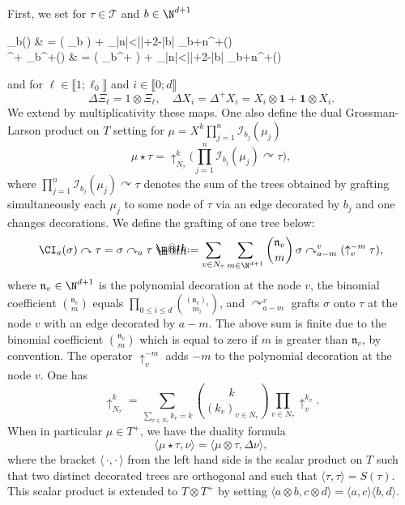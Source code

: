 \documentclass[11pt]{preprint}
\makeatletter
\def\id{\mathrm{id}}
\newcommand{\mcI}{\mathcal{I}}
\newcommand{\mcT}{\mathcal{T}}
\def\Labn{\mathfrak{n}}
\def\one{\mathbf{1}}
\newcommand*{\defeq}{\mathrel{\rlap{%
			\raisebox{0.3ex}{$\m@th\cdot$}}%
		\raisebox{-0.3ex}{$\m@th\cdot$}}%
	=}
\renewcommand{\lg}{\langle}
\newcommand{\rg}{\rangle}
\newcommand{\bbrack}[1]{ \llbracket #1 \rrbracket }
\makeatother
\begin{document}
	First, we set for $\tau\in\mcT$ and $b\in\N^{d+1}$ 
	\begin{equs}\label{eq_CoproductOfMcItau}
	\begin{aligned}	\Delta \mcI_b(\tau) & = ( \mcI_b \otimes \id ) \Delta \tau + \sum_{|n|<|\tau|+2-|b|}   \otimes \mcI_{b+n}^{+}(\tau)
		\\
		\Delta^{\!+} \mcI_b^+(\tau) & = ( \mcI_b^+ \otimes \id ) \Delta \tau + \sum_{|n|<|\tau|+2-|b|}   \otimes \mcI_{b+n}^{+}(\tau)
		\end{aligned}
	\end{equs}
	and for $\ell\in\bbrack{1;\ell_0}$ and $ i \in \bbrack{0;d}$
	$$
	\Delta \Xi_\ell = 1\otimes \Xi_\ell, \quad \Delta X_i = \Delta^{\! +}X_i  = X_i \otimes \one + \one \otimes X_i. 
	$$We extend by multiplicativity these maps. One also define the dual Grossman-Larson product on $T$ setting for $\mu = X^k\prod_{j=1}^n\mcI_{b_j}(\mu_j)$
	\label{star_product}
	$$
	\mu \star \tau = \uparrow^k_{N_\tau} \Big(\prod_{j=1}^n\mcI_{b_j}(\mu_j) \curvearrowright \tau \Big),
	$$
	where $\prod_{j=1}^n \mcI_{b_j}(\mu_j) \curvearrowright \tau$ denotes the sum of the trees obtained by grafting simultaneously each $\mu_j$ to some node of $\tau$ via an edge decorated by $ b_j $ and one changes decorations. We define the grafting of one tree below: 
	\begin{equation*}
\CI_{a}(\sigma) \curvearrowright \tau	= 	\sigma \curvearrowright_a \tau \defeq \sum_{v\in N_{\tau}}\sum_{m\in\N^{d+1}} {\Labn_v \choose m} \,\sigma  \curvearrowright^v_{a-m}(\uparrow_v^{-m} \tau),
	\end{equation*}
	where $\Labn_v\in\N^{d+1}$ is the polynomial decoration at the node $v$, {\color{black} the binomial coefficient ${\Labn_v \choose m}$ equals $\prod_{0\leq i\leq d}{(\Labn_v)_i \choose m_i}$}, and $\curvearrowright^v_{a-m}$ grafts $ \sigma $ onto $\tau$ at the node $ v $ with an edge decorated by $a -m$. The above sum is finite due to the binomial coefficient $ {\Labn_v \choose m} $ which is equal to zero if $m$ is greater than $ \Labn_v $, by convention. The operator $\uparrow_v^{-m}$ adds $ -m $ to the polynomial decoration at the node $v$.
	One has
	 $$\uparrow^k_{N_\tau} = \sum_{\sum_{v\in N_\tau}k_v=k} {k \choose (k_v)_{v \in N_{\tau}}} \prod_{v\in N_\tau}\uparrow_v^{k_v}.$$ When in particular $\mu\in T^+$, we have the duality formula
	$$
	\lg \mu \star \tau , \nu     \rg = 	\lg \mu\otimes\tau , \Delta\nu     \rg,
	$$
	where the bracket $\lg\, \cdot, \cdot\,\rg$ from the left hand side  is the scalar product on $T$ such that two distinct decorated trees are orthogonal and such that $\lg\tau,\tau\rg =S(\tau)$. This scalar product is extended to $T\otimes T^+$ by setting $\lg a\otimes b,c\otimes d\rg=\lg a,c\rg\lg b, d\rg$.
\end{document}
